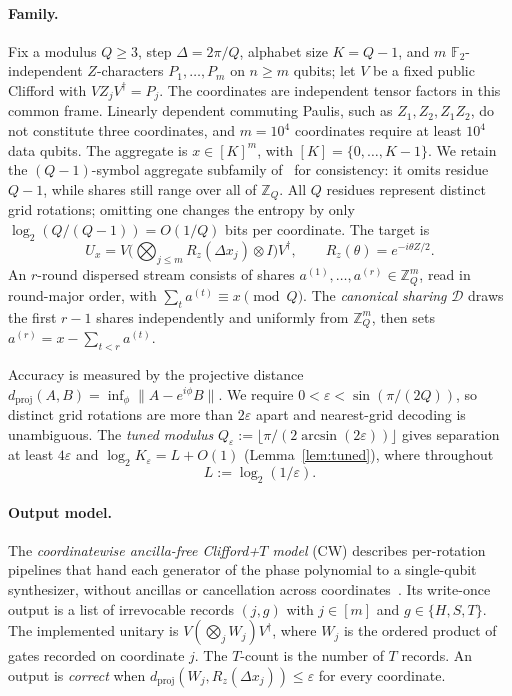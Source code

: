 \documentclass[aps,prx,twocolumn,superscriptaddress,nofootinbib,longbibliography]{revtex4-2}
\theoremstyle{plain}
\theoremstyle{definition}
\theoremstyle{remark}
\newcommand{\dproj}{d_{\mathrm{proj}}}
\newcommand{\Z}{\mathbb{Z}}
\newcommand{\F}{\mathbb{F}}
\begin{document}
\paragraph{Family.} Fix a modulus $Q\ge3$, step $\Delta=2\pi/Q$, alphabet size $K=Q-1$, and $m$ $\F_2$-independent $Z$-characters $P_1,\dots,P_m$ on $n\ge m$ qubits; let $V$ be a fixed public Clifford with $VZ_jV^\dagger=P_j$. The coordinates are independent tensor factors in this common frame. Linearly dependent commuting Paulis, such as $Z_1,Z_2,Z_1Z_2$, do not constitute three coordinates, and $m=10^4$ coordinates require at least $10^4$ data qubits. The aggregate is $x\in[K]^m$, with $[K]=\{0,\dots,K-1\}$. We retain the $(Q-1)$-symbol aggregate subfamily of~\cite{Paper1} for consistency: it omits residue $Q-1$, while shares still range over all of $\Z_Q$. All $Q$ residues represent distinct grid rotations; omitting one changes the entropy by only $\log_2(Q/(Q-1))=O(1/Q)$ bits per coordinate. The target is
\begin{equation}
U_x=V\Big(\bigotimes_{j\le m}R_z(\Delta x_j)\otimes I\Big)V^\dagger,\qquad R_z(\theta)=e^{-i\theta Z/2}.
\end{equation}
An $r$-round dispersed stream consists of shares $a^{(1)},\dots,a^{(r)}\in\Z_Q^m$, read in round-major order, with $\sum_ta^{(t)}\equiv x\pmod Q$. The \emph{canonical sharing} $\mathcal D$ draws the first $r-1$ shares independently and uniformly from $\Z_Q^m$, then sets $a^{(r)}=x-\sum_{t<r}a^{(t)}$.

Accuracy is measured by the projective distance $\dproj(A,B)=\inf_\phi\|A-e^{i\phi}B\|$. We require $0<\varepsilon<\sin(\pi/(2Q))$, so distinct grid rotations are more than $2\varepsilon$ apart and nearest-grid decoding is unambiguous. The \emph{tuned modulus} $Q_\varepsilon:=\lfloor\pi/(2\arcsin(2\varepsilon))\rfloor$ gives separation at least $4\varepsilon$ and $\log_2K_\varepsilon=L+O(1)$ (Lemma~\ref{lem:tuned}), where throughout
\begin{equation}
L:=\log_2(1/\varepsilon).
\end{equation}

\paragraph{Output model.} The \emph{coordinatewise ancilla-free Clifford+$T$ model} (CW) describes per-rotation pipelines that hand each generator of the phase polynomial to a single-qubit synthesizer, without ancillas or cancellation across coordinates~\cite{RossSelinger,Paper1}. Its write-once output is a list of irrevocable records $(j,g)$ with $j\in[m]$ and $g\in\{H,S,T\}$. The implemented unitary is $V(\bigotimes_jW_j)V^\dagger$, where $W_j$ is the ordered product of gates recorded on coordinate $j$. The $T$-count is the number of $T$ records. An output is \emph{correct} when $\dproj(W_j,R_z(\Delta x_j))\le\varepsilon$ for every coordinate.
\end{document}
